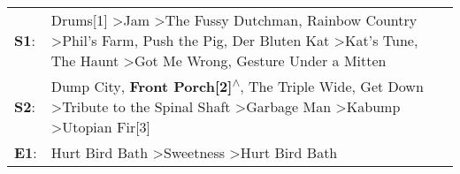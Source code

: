 \begin{supertabular}{p{0.03\textwidth}p{0.92\textwidth}}
 \textbf{S1}:  &  Drums[1]\textsuperscript{} \textgreater \enspace Jam\textsuperscript{} \textgreater \enspace The Fussy Dutchman\textsuperscript{}, \enspace Rainbow Country\textsuperscript{} \textgreater \enspace Phil's Farm\textsuperscript{}, \enspace Push the Pig\textsuperscript{}, \enspace Der Bluten Kat\textsuperscript{} \textgreater \enspace Kat's Tune\textsuperscript{}, \enspace The Haunt\textsuperscript{} \textgreater \enspace Got Me Wrong\textsuperscript{}, \enspace Gesture Under a Mitten\textsuperscript{}  \enspace  \\
 \textbf{S2}:  &                                                                                                                  Dump City\textsuperscript{}, \enspace \textbf{Front Porch[2]\textsuperscript{$\wedge$}}, \enspace The Triple Wide\textsuperscript{}, \enspace Get Down\textsuperscript{} \textgreater \enspace Tribute to the Spinal Shaft\textsuperscript{} \textgreater \enspace Garbage Man\textsuperscript{} \textgreater \enspace Kabump\textsuperscript{} \textgreater \enspace Utopian Fir[3]\textsuperscript{}  \enspace  \\
 \textbf{E1}:  &                                                                                                                                                                                                                                                                                                                                                                               Hurt Bird Bath\textsuperscript{} \textgreater \enspace Sweetness\textsuperscript{} \textgreater \enspace Hurt Bird Bath\textsuperscript{}  \enspace  \\
\end{supertabular}
